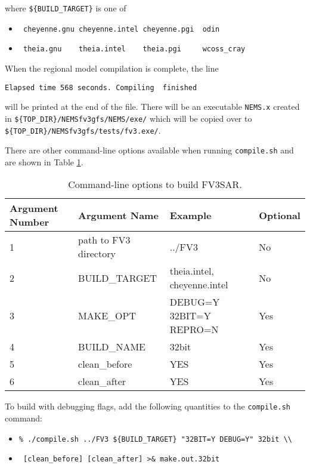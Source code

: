 where \verb|${BUILD_TARGET}| is one of

\begin{itemize}
  \item[] \verb| cheyenne.gnu cheyenne.intel cheyenne.pgi  odin |
  \item[] \verb| theia.gnu    theia.intel    theia.pgi     wcoss_cray | 
\end{itemize}

When the regional model compilation is complete, the line

\verb|Elapsed time 568 seconds. Compiling  finished|
 
will be printed at the end of the file.  There will be an executable \verb|NEMS.x| created in
\verb|${TOP_DIR}/NEMSfv3gfs/NEMS/exe/| which will be copied over to \verb|${TOP_DIR}/NEMSfv3gfs/tests/fv3.exe/|.

There are other command-line options available when running \verb|compile.sh| and are shown in Table
\ref{tab:compile_args}.

\begin{table}[!htb]
\begin{center}
\begin{tabular}{ l l l l }
\hline
 Argument Number & Argument Name          & Example                      & Optional \\
\hline
 1               & path to FV3 directory  & ../FV3                       & No       \\ 
 2               & BUILD\_TARGET          & theia.intel, cheyenne.intel  & No       \\ 
 3               & MAKE\_OPT              & DEBUG=Y 32BIT=Y REPRO=N      & Yes      \\ 
 4               & BUILD\_NAME            & 32bit                        & Yes      \\ 
 5               & clean\_before          & YES                          & Yes      \\ 
 6               & clean\_after           & YES                          & Yes      \\ 
\hline
\end{tabular}
\caption{\label{tab:compile_args} Command-line options to build FV3SAR.}
\end{center}
\end{table}

To build with debugging flags, add the following quantities to the \verb|compile.sh| command:

\begin{itemize}
  \item[] \verb|% ./compile.sh ../FV3 ${BUILD_TARGET} "32BIT=Y DEBUG=Y" 32bit \\|
  \item[] \verb| [clean_before] [clean_after] >& make.out.32bit|
\end{itemize}

